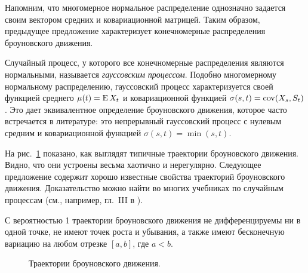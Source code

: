 \begin{remark}
Напомним, что многомерное нормальное распределение однозначно задается своим вектором средних и ковариационной матрицей.
Таким образом, предыдущее предложение характеризует конечномерные распределения броуновского движения.

Случайный процесс, у которого все конечномерные распределения являются нормальными, называется \emph{гауссовским процессом}.
Подобно многомерному нормальному распределению, гауссовский процесс характеризуется своей функцией среднего $\mu(t) = \operatorname{E} X_t$ и ковариационной функцией $\sigma(s,t) = \operatorname{cov}(X_s,S_t)$.
Это дает эквивалентное определение броуновского движения, которое часто встречается в литературе: это непрерывный гауссовский процесс с нулевым средним и ковариационной функцией $\sigma(s,t) = \min(s,t)$.
\end{remark}

На рис.~\ref{6:trajectory} показано, как выглядят типичные траектории броуновского движения.
Видно, что они устроены весьма хаотично и нерегулярно.
Следующее предложение содержит хорошо известные свойства траекторий броуновского движения. 
Доказательство можно найти во многих учебниках по случайным процессам (см., например, гл.~III в \cite{BulinskiShiryaev04}).

\begin{proposition}
С вероятностью 1 траектории броуновского движения не дифференцируемы ни в одной точке, не имеют точек роста и убывания, а также имеют бесконечную вариацию на любом отрезке $[a,b]$, где $a<b$.
\end{proposition}

\begin{figure}[h]
\centering
{}
\caption{Траектории броуновского движения.}
\label{6:trajectory}
\end{figure}


